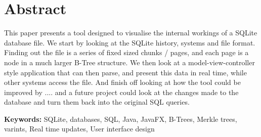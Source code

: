 \section*{\centering Abstract}
\begin{center}
	This paper presents a tool designed to visualise the internal workings of a SQLite database file. We start by looking at the SQLite history, systems and file format. Finding out the file is a series of fixed sized chunks / pages, and each page is a node in a much larger B-Tree structure. We then look at a model-view-controller style application that can then parse, and present this data in real time, while other systems access the file. And finish off looking at how the tool could be improved by .... and a future project could look at the changes made to the database and turn them back into the original SQL queries. 
\end{center} 

\vspace{1.5cm}

\textbf{Keywords:} SQLite, databases, SQL, Java, JavaFX, B-Trees, Merkle trees, varints, Real time updates, User interface design